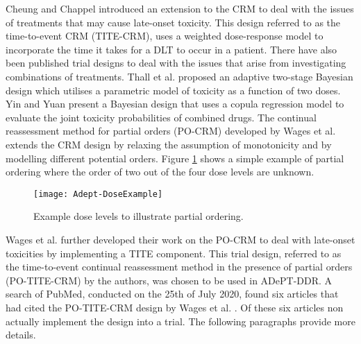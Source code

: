Cheung and Chappel \cite{cheungSequentialDesignsPhase2000} introduced an extension to the CRM to deal with the issues of treatments that may cause late-onset toxicity. This design referred to as the time-to-event CRM (TITE-CRM), uses a weighted dose-response model to incorporate the time it takes for a DLT to occur in a patient. There have also been published trial designs to deal with the issues that arise from investigating combinations of treatments. Thall et al. \cite{thallDoseFindingTwoAgents2003} proposed an adaptive two-stage Bayesian design which utilises a parametric model of toxicity as a function of two doses. Yin and Yuan \cite{yinBayesianDoseFinding2009} present a Bayesian design that uses a copula regression model to evaluate the joint toxicity probabilities of combined drugs. The continual reassessment method for partial orders (PO-CRM) developed by Wages et al. \cite{wagesContinualReassessmentMethod2011} extends the CRM design by relaxing the assumption of monotonicity and by modelling different potential orders. Figure \ref{fig_adept:example_dose_levels} shows a simple example of partial ordering where the order of two out of the four dose levels are unknown. 

\begin{figure}[h!]
	\centering
	\caption{Example dose levels to illustrate partial ordering.}
	\label{fig_adept:example_dose_levels}
	\texttt{[image: Adept-DoseExample]}
\end{figure}

Wages et al. \cite{wagesContinualReassessmentMethod2011, wagesUsingTimetoeventContinual2013} further developed their work on the PO-CRM to deal with late-onset toxicities by implementing a TITE component. This trial design, referred to as the time-to-event continual reassessment method in the presence of partial orders (PO-TITE-CRM) by the authors, was chosen to be used in ADePT-DDR. A search of PubMed, conducted on the 25th of July 2020, found six articles that had cited the PO-TITE-CRM design by Wages et al. \cite{wagesUsingTimetoeventContinual2013}. Of these six articles non actually implement the design into a trial. The following paragraphs provide more details. 

